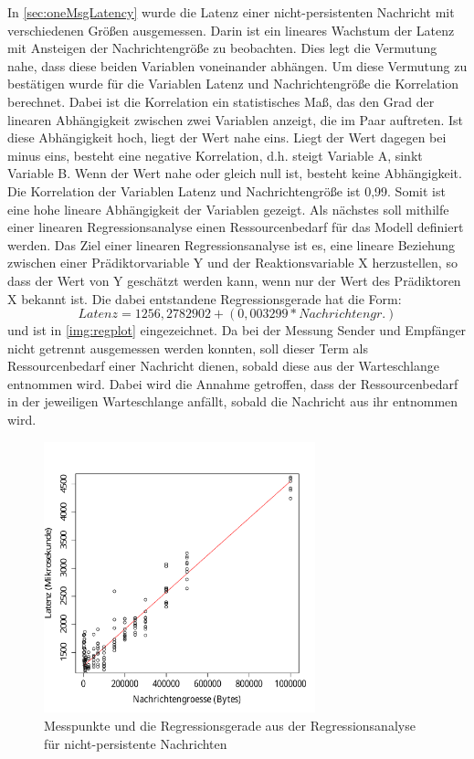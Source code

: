 In \autoref{sec:oneMsgLatency} wurde die Latenz einer nicht-persistenten Nachricht mit verschiedenen Größen ausgemessen. Darin ist ein lineares Wachstum der Latenz mit Ansteigen der Nachrichtengröße zu beobachten. Dies legt die Vermutung nahe, dass diese beiden Variablen voneinander abhängen. Um diese Vermutung zu bestätigen wurde für die Variablen Latenz und Nachrichtengröße die Korrelation berechnet. Dabei ist die Korrelation ein statistisches Maß, das den Grad der linearen Abhängigkeit zwischen zwei Variablen anzeigt, die im Paar auftreten. Ist diese Abhängigkeit hoch, liegt der Wert nahe eins. Liegt der Wert dagegen bei minus eins, besteht eine negative Korrelation, d.h. steigt Variable A, sinkt Variable B. Wenn der Wert nahe oder gleich null ist, besteht keine Abhängigkeit. Die Korrelation der Variablen Latenz und Nachrichtengröße ist 0,99. Somit ist eine hohe lineare Abhängigkeit der Variablen gezeigt. Als nächstes soll mithilfe einer linearen Regressionsanalyse einen Ressourcenbedarf für das Modell definiert werden. Das Ziel einer linearen Regressionsanalyse ist es, eine lineare Beziehung zwischen einer Prädiktorvariable Y und der Reaktionsvariable X herzustellen, so dass der Wert von Y geschätzt werden kann, wenn nur der Wert des Prädiktoren X bekannt ist. Die dabei entstandene Regressionsgerade hat die Form: \[Latenz = 1256,2782902 + (0,003299 * Nachrichtengr.)\] und ist in \autoref{img:regplot} eingezeichnet. Da bei der Messung Sender und Empfänger nicht getrennt ausgemessen werden konnten, soll dieser Term als Ressourcenbedarf einer Nachricht dienen, sobald diese aus der Warteschlange entnommen wird. Dabei wird die Annahme getroffen, dass der Ressourcenbedarf in der jeweiligen Warteschlange anfällt, sobald die Nachricht aus ihr entnommen wird. 
\begin{figure}
\center
  \includegraphics[width=0.7\textwidth]{images/modelling/oneMsgRegression.pdf}
  \caption{Messpunkte und die Regressionsgerade aus der Regressionsanalyse für nicht-persistente Nachrichten}
  \label{img:regplot}
\end{figure}

